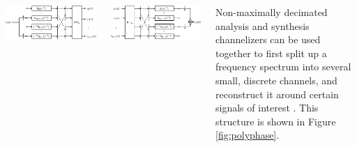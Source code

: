 \documentclass[24pt, a0papper, portrait]{tikzposter}
\begin{document}
\begin{columns}
{        \begin{center}
        \begin{tikzfigure*}
            \centering
            \includegraphics[width=0.65\linewidth]{polyphase_analysis_nmdfb}
        \end{tikzfigure*}
        \end{center}
        \begin{tikzfigure}[Non-maximally decimated ($D=M/2$) polyphase analysis and synthesis channelizers]
            \centering
            \includegraphics[width=0.65\linewidth]{polyphase_synthesis_nmdfb}
        \label{fig:polyphase_structures}
        \end{tikzfigure}
        Non-maximally decimated analysis and synthesis channelizers can be used
        together to first split up a frequency spectrum into several small,
        discrete channels, and reconstruct it around certain signals of
        interest \cite{Harris2}. This structure is shown in Figure
        \ref{fig:polyphase}.

}
\end{columns}
\end{document}
